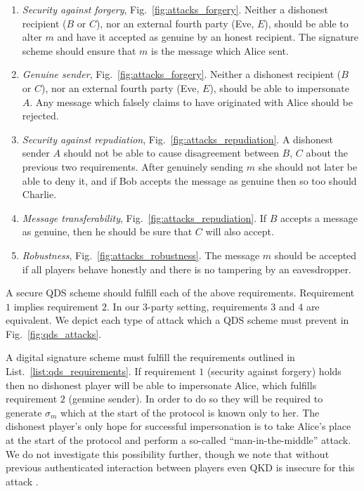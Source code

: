 \begin{mylist}
\captionsetup{width=0.8\linewidth}
\begin{framed}
\begin{enumerate}
\item\emph{Security against forgery}, Fig.~\ref{fig:attacks_forgery}. Neither a dishonest recipient ($B$ or $C$), nor an external fourth party (Eve, $E$), should be able to alter $m$ and have it accepted as genuine by an honest recipient. The signature scheme should ensure that $m$ is the message which Alice sent.

\item\emph{Genuine sender}, Fig.~\ref{fig:attacks_forgery}. Neither a dishonest recipient ($B$ or $C$), nor an external fourth party (Eve, $E$), should be able to impersonate $A$. Any message which falsely claims to have originated with Alice should be rejected.

\item\emph{Security against repudiation}, Fig.~\ref{fig:attacks_repudiation}. A dishonest sender $A$ should not be able to cause disagreement between $B$, $C$ about the previous two requirements. After genuinely sending $m$ she should not later be able to deny it, and if Bob accepts the message as genuine then so too should Charlie. 

\item \emph{Message transferability}, Fig.~\ref{fig:attacks_repudiation}. If $B$ accepts a message as genuine, then he should be sure that $C$ will also accept.

\item \emph{Robustness}, Fig.~\ref{fig:attacks_robustness}. The message $m$ should be accepted if all players behave honestly and there is no tampering by an eavesdropper.
\end{enumerate}
\caption{\label{list:qds_requirements} A secure QDS scheme should fulfill each of the above requirements. Requirement $1$ implies requirement $2$. In our $3$-party setting, requirements $3$ and $4$ are equivalent. We depict each type of attack which a QDS scheme must prevent in Fig.~\ref{fig:qds_attacks}.}
\end{framed}
\end{mylist}



A digital signature scheme must fulfill the requirements outlined in List.~\ref{list:qds_requirements}. If requirement $1$ (security against forgery) holds then no dishonest player will be able to impersonate Alice, which fulfills requirement $2$ (genuine sender). In order to do so they will be required to generate $\sigma_m$ which at the start of the protocol is known only to her. The dishonest player's only hope for successful impersonation is to take Alice's place at the start of the protocol and perform a so-called ``man-in-the-middle'' attack. We do not investigate this possibility further, though we note that without previous authenticated interaction between players even QKD is insecure for this attack \cite{Broadbent2015}.

